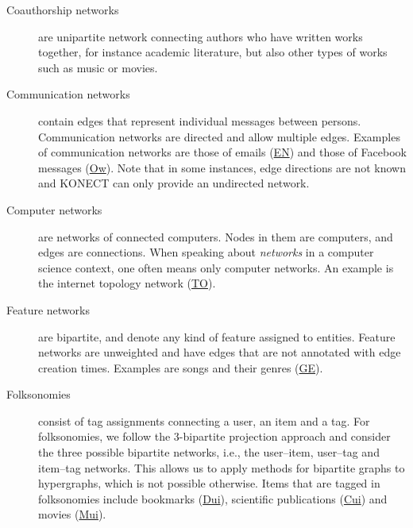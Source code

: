 \documentclass{article}
\begin{document}
\begin{description}
\item[Coauthorship networks] are unipartite network connecting authors
  who have written works together, for instance academic literature, but
  also other types of works such as music or movies. 

\item[Communication networks] contain edges that represent
  individual messages between persons.  Communication networks are directed
  and allow multiple edges.  
  Examples of communication networks are those of
  emails (\href{http://konect.uni-koblenz.de/networks/enron}{\textsf{EN}})
  and those of
  Facebook messages
  (\href{http://konect.uni-koblenz.de/networks/facebook-wosn-wall}{\textsf{Ow}}). Note
  that in some instances, edge directions are not 
  known and KONECT can only provide an undirected network. 

\item[Computer networks] are networks of connected computers. 
  Nodes in them are computers, and edges are connections. 
  When speaking about \emph{networks} in a computer science context, one
  often means only computer networks.  An example is the internet
  topology network (\href{http://konect.uni-koblenz.de/networks/topology}{\textsf{TO}}).

\item[Feature networks] are bipartite, and denote any kind of feature
  assigned to entities. Feature networks are unweighted and have
  edges that are not annotated with edge creation times.  Examples are
  songs and their genres
  (\href{http://konect.uni-koblenz.de/networks/dbpedia-genre}{\textsf{GE}}).   

\item[Folksonomies] consist of tag assignments connecting a user, an
  item and a tag.  For folksonomies, we follow the 3-bipartite
  projection approach and consider the three possible bipartite
  networks, i.e., the user--item, user--tag and item--tag networks.
  This allows us to apply methods for bipartite graphs to hypergraphs,
  which is not possible otherwise.  Items that are tagged in
  folksonomies include bookmarks
  (\href{http://konect.uni-koblenz.de/networks/delicious-ui}{\textsf{Dui}}),
  scientific publications
  (\href{http://konect.uni-koblenz.de/networks/citeulike-ui}{\textsf{Cui}})
  and movies
  (\href{http://konect.uni-koblenz.de/networks/movielens-10m_ui}{\textsf{Mui}}).


\end{description}
\end{document}
